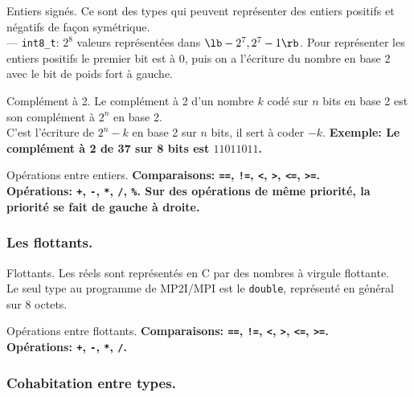 \documentclass[french, 11pt]{article}
\begin{document}
\begin{defi}{Entiers signés.}{}
    Ce sont des types qui peuvent représenter des entiers positifs et négatifs de façon symétrique.\\
    --- \texttt{int8\_t}: $2^8$ valeurs représentées dans $\lb-2^7, 2^7-1\rb$.\n
    Pour représenter les entiers positifs le premier bit est à 0, puis on a l'écriture du nombre en base 2 avec le bit de poids fort à gauche.
\end{defi}

\begin{defi}{Complément à 2.}{}
    Le complément à 2 d'un nombre $k$ codé sur $n$ bits en base 2 est son complément à $2^n$ en base 2.\\
    C'est l'écriture de $2^n-k$ en base 2 sur $n$ bits, il sert à coder $-k$.\n
    \bf{Exemple:} Le complément à 2 de 37 sur 8 bits est $11011011$.
\end{defi}

\begin{defi}{Opérations entre entiers.}{}
    \bf{Comparaisons:} \texttt{==}, \texttt{!=}, \texttt{<}, \texttt{>}, \texttt{<=}, \texttt{>=}.\\
    \bf{Opérations:} \texttt{+}, \texttt{-}, \texttt{*}, \texttt{/}, \texttt{\%}.\n
    Sur des opérations de même priorité, la priorité se fait de gauche à droite.
\end{defi}

\subsubsection{Les flottants.}

\begin{defi}{Flottants.}{}
    Les réels sont représentés en C par des nombres à virgule flottante.\\
    Le seul type au programme de MP2I/MPI est le \texttt{double}, représenté en général sur 8 octets.
\end{defi}

\begin{defi}{Opérations entre flottants.}{}
    \bf{Comparaisons:} \texttt{==}, \texttt{!=}, \texttt{<}, \texttt{>}, \texttt{<=}, \texttt{>=}.\\
    \bf{Opérations:} \texttt{+}, \texttt{-}, \texttt{*}, \texttt{/}.
\end{defi}

\subsubsection{Cohabitation entre types.}
\end{document}
